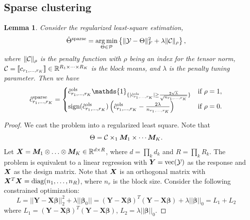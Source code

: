 \documentclass{article}
\newtheorem{lemma}{Lemma}
\newtheorem{proof}{Proof}
\begin{document}
\begin{appendices}
\subsection{Sparse clustering}
\begin{lemma}\label{lem:sparse}
Consider the regularized least-square estimation,
\[
\hat \Theta^{\text{sparse}}=\operatorname*{arg\,min}_{\Theta\in \mathcal{P}}\left\{\lVert\mathcal{Y}-\Theta\rVert_F^2+\lambda \lVert\mathcal{C}\rVert_\rho
\right\},
\]
where $\lVert\mathcal{C}\rVert_\rho$ is the penalty function with $\rho$ being an index for the tensor norm, $\mathcal{C}=\llbracket c_{r_1,\ldots,r_K} \rrbracket\in\mathbb{R}^{R_1\times \cdots\times R_K}$ is the block means, and $\lambda$ is the penalty tuning parameter. Then we have
\begin{equation}\label{eq:lasso}
\hat c^{\text{sparse}}_{r_1,\ldots,r_K}=
\begin{cases}
\hat c^{\text{ols}}_{r_1,\ldots,r_K}\mathds{1}_{\{|\hat c^{\text{ols}}_{r_1,\ldots,r_K} |\geq {2\sqrt{\lambda} \over \sqrt{n_{r_1,\ldots,r_K}}}\}} & \text{if}\ \rho=1,\\
\text{sign}(\hat c^{\text{ols}}_{r_1,\ldots,r_K})\left( \hat c^{\text{ols}}_{r_1,\ldots,r_K}-{2\lambda \over n_{r_1,\ldots,r_K}}  \right) &\text{if}\ \rho=0.
\end{cases}
\end{equation}
\end{lemma}

\begin{proof}
We cast the problem into a regularized least square. Note that
\[
\Theta=\mathcal{C}\times_1\bm M_1\times \cdots \bm M_K.
\]
Let $\bm X=\bm M_1\otimes \ldots \otimes \bm M_K\in \mathbb{R}^{d\times R}$, where $d=\prod_k d_k$ and $R=\prod_k R_k$. The problem is equivalent to a linear regression with $\bm Y=\text{vec}(\mathcal{Y})$ as the response and $\bm X$ as the design matrix. Note that $\bm X$ is an orthogonal matrix with $\bm X^T\bm X=\text{diag}(n_1,\ldots,n_{R})$, where $n_r$ is the block size. 
Consider the following constrained optimization: 
\begin{equation*}
L=||\mathbf{Y-X}\bm{\beta}||^2_2+\lambda||\bm{\beta}_0||=(\mathbf{Y-X}\bm{\beta})^T(\mathbf{Y-X}\bm{\beta})+\lambda ||\bm{\beta}||_0=L_1+L_2
\end{equation*} 
where $L_1=(\mathbf{Y-X}\bm{\beta})^T(\mathbf{Y-X}\bm{\beta})$, $L_2=\lambda ||\bm{\beta}||_0$. 


\end{proof}
\end{appendices}
\end{document}
